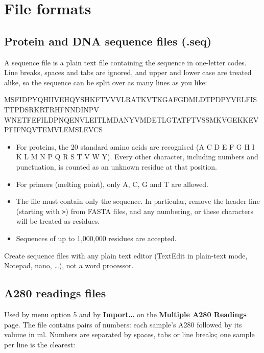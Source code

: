 \documentclass[11pt,a4paper,oneside]{report}
\newcommand{\cmd}[1]{\texttt{#1}}            %
\newcommand{\gui}[1]{\textsf{\textbf{#1}}}  %
\begin{document}
\chapter{File formats}\label{ch:files}

\section{Protein and DNA sequence files (.seq)}\label{sec:seq-files}

A sequence file is a plain text file containing the sequence in one-letter codes. Line breaks,
spaces and tabs are ignored, and upper and lower case are treated alike, so the sequence can be
split over as many lines as you like:

\begin{listing}
MSFIDPYQHIIVEHQYSHKFTVVVLRATKVTKGAFGDMLDTPDPYVELFISTTPDSRKRTRHFNNDINPV
WNETFEFILDPNQENVLEITLMDANYVMDETLGTATFTVSSMKVGEKKEVPFIFNQVTEMVLEMSLEVCS
\end{listing}

\begin{itemize}
  \item For proteins, the 20 standard amino acids are recognised (A C D E F G H I K L M N P Q R S T
        V W Y). Every other character, including numbers and punctuation, is counted as an unknown
        residue at that position.
  \item For primers (melting point), only A, C, G and T are allowed.
  \item The file must contain only the sequence. In particular, remove the header line
        (starting with \cmd{>}) from FASTA files, and any numbering, or these characters will be
        treated as residues.
  \item Sequences of up to 1{,}000{,}000 residues are accepted.
\end{itemize}

Create sequence files with any plain text editor (TextEdit in plain-text mode, Notepad, nano,
\ldots), not a word processor.

\section{A280 readings files}\label{sec:readings-file}

Used by menu option 5 and by \gui{Import\ldots} on the \gui{Multiple A280 Readings} page. The file
contains pairs of numbers: each sample's A280 followed by its volume in ml. Numbers are separated by
spaces, tabs or line breaks; one sample per line is the clearest:
\end{document}
